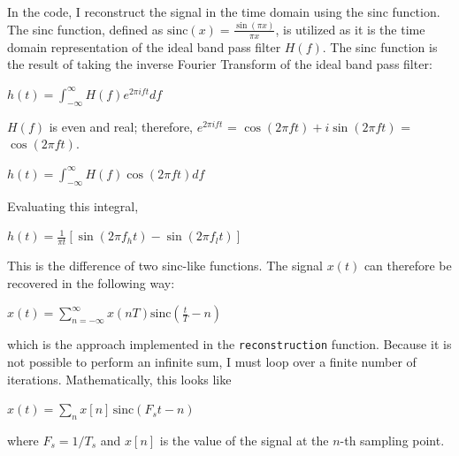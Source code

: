 \documentclass{article}
\begin{document}
In the code, I reconstruct the signal in the time domain using the sinc function.
The sinc function, defined as $\text{sinc}(x) = \frac{\sin(\pi x)}{\pi x}$, is utilized as it is the time domain representation of the ideal band pass filter $H(f)$.
The sinc function is the result of taking the inverse Fourier Transform of the ideal band pass filter:
\begin{center}
    \begin{math}
        h(t) = \displaystyle \int_{-\infty}^{\infty} H(f) e^{2\pi i ft} df
    \end{math}  
\end{center}
$H(f)$ is even and real; therefore, $e^{2\pi i ft}$ = $\cos(2\pi ft) + i \sin(2\pi ft)$ = $\cos(2\pi ft)$.
\begin{center}
    \begin{math}
        h(t) = \displaystyle \int_{-\infty}^{\infty} H(f) \cos(2\pi ft) df
    \end{math}  
\end{center}
Evaluating this integral,
\begin{center}
    \begin{math}
        h(t) = \frac{1}{\pi t} \left[ \sin(2\pi f_h t) - \sin(2\pi f_l t) \right]
    \end{math}  
\end{center}
This is the difference of two sinc-like functions. 
The signal $x(t)$ can therefore be recovered in the following way:
\begin{center}
    \begin{math}
        x(t) = \displaystyle\sum_{n=-\infty}^{\infty} x(nT) \text{sinc}\left( \frac{t}{T} - n \right)
    \end{math}  
\end{center}
which is the approach implemented in the \verb|reconstruction| function. Because it is not possible to perform an infinite sum, I must loop over a finite number of iterations. Mathematically, this looks like
\begin{center}
    \begin{math}
        x(t) = \displaystyle\sum_{n}^{} x[n]\, \text{sinc}\left( F_st - n \right)
    \end{math}  
\end{center}
where $F_s = 1/T_s$ and $x[n]$ is the value of the signal at the $n$-th sampling point.
\end{document}
